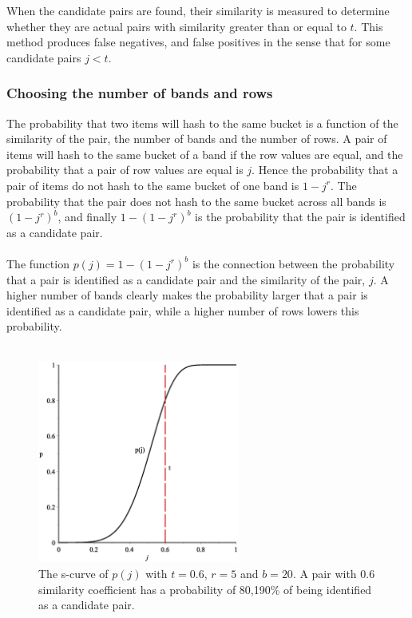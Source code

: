 When the candidate pairs are found, their similarity is measured to determine whether they are actual pairs with similarity greater than or equal to \(t\). This method produces false negatives, and false positives in the sense that for some candidate pairs \(j<t\).

\subsubsection{Choosing the number of bands and rows}
The probability that two items will hash to the same bucket is a function of the similarity of the pair, the number of bands and the number of rows. A pair of items will hash to the same bucket of a band if the row values are equal, and the probability that a pair of row values are equal is \(j\). Hence the probability that a pair of items do not hash to the same bucket of one band is \(1-j^r\). The probability that the pair does not hash to the same bucket across all bands is \((1-j^r)^b\), and finally \(1-(1-j^r)^b\) is the probability that the pair is identified as a candidate pair.\\ \\
The function \(p(j) = 1-(1-j^r)^b\) is the connection between the probability that a pair is identified as a candidate pair and the similarity of the pair, \(j\). A higher number of bands clearly makes the probability larger that a pair is identified as a candidate pair, while a higher number of rows lowers this probability.\\ \\
\begin{figure}[H]
	\centering
	\includegraphics[width=250px]{img/pGraph.eps}
	\caption{The s-curve of \(p(j)\) with \(t = 0.6\), \(r = 5\) and \(b =20\). A pair with 0.6 similarity coefficient has a probability of 80,190\% of being identified as a candidate pair.} 
	\label{fig:p_graph}
\end{figure}
